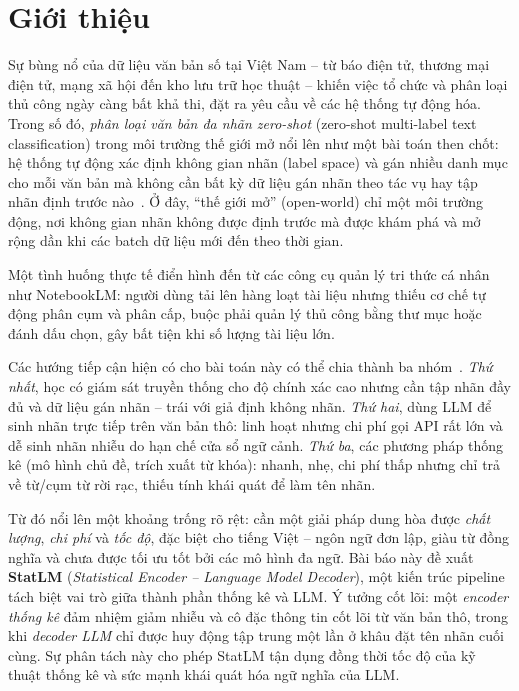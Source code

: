 \section{Giới thiệu}
Sự bùng nổ của dữ liệu văn bản số tại Việt Nam -- từ báo điện
tử, thương mại điện tử, mạng xã hội đến kho lưu trữ học thuật -- khiến việc tổ
chức và phân loại thủ công ngày càng bất khả thi, đặt ra yêu cầu về các hệ thống
tự động hóa. Trong số đó, \emph{phân loại văn bản đa
nhãn zero-shot} (zero-shot multi-label text classification) trong môi trường thế
giới mở nổi lên như một bài toán then chốt: hệ thống tự động xác định không gian
nhãn (label space) và gán nhiều danh mục cho mỗi văn bản mà không cần bất kỳ dữ
liệu gán nhãn theo tác vụ hay tập nhãn định trước nào~\cite{li2024open}. Ở đây,
``thế giới mở'' (open-world) chỉ một môi trường động, nơi không gian nhãn không
được định trước mà được khám phá và mở rộng dần khi các batch dữ liệu mới đến
theo thời gian.

Một tình huống thực tế điển hình đến từ các công cụ quản lý tri thức cá nhân như
NotebookLM: người dùng tải lên hàng loạt tài liệu nhưng thiếu cơ chế tự động
phân cụm và phân cấp, buộc phải quản lý thủ công bằng thư mục hoặc đánh dấu chọn,
gây bất tiện khi số lượng tài liệu lớn.

Các hướng tiếp cận hiện có cho bài toán
này có thể chia thành ba nhóm~\cite{li2024open}. \emph{Thứ nhất}, học có giám sát
truyền thống cho độ chính xác cao nhưng cần tập nhãn đầy đủ và dữ liệu gán nhãn
-- trái với giả định không nhãn. \emph{Thứ hai}, dùng LLM để sinh nhãn trực tiếp
trên văn bản thô: linh hoạt nhưng chi phí gọi API rất lớn và dễ sinh nhãn nhiễu
do hạn chế cửa sổ ngữ cảnh. \emph{Thứ ba}, các phương pháp thống kê (mô hình chủ
đề, trích xuất từ khóa): nhanh, nhẹ, chi phí thấp nhưng chỉ trả về từ/cụm từ rời
rạc, thiếu tính khái quát để làm tên nhãn.

Từ đó nổi lên một khoảng trống rõ rệt: cần một giải pháp dung hòa được
\emph{chất lượng}, \emph{chi phí} và \emph{tốc độ}, đặc biệt cho tiếng Việt --
ngôn ngữ đơn lập, giàu từ đồng nghĩa và chưa được tối ưu tốt bởi các mô hình đa
ngữ. Bài báo này đề xuất \textbf{StatLM} (\emph{Statistical Encoder -- Language
Model Decoder}), một kiến trúc pipeline tách biệt vai trò giữa thành phần thống
kê và LLM. Ý tưởng cốt lõi: một \emph{encoder thống kê} đảm nhiệm giảm nhiễu và
cô đặc thông tin cốt lõi từ văn bản thô, trong khi \emph{decoder LLM} chỉ được
huy động tập trung một lần ở khâu đặt tên nhãn cuối cùng. Sự phân tách này cho
phép StatLM tận dụng đồng thời tốc độ của kỹ thuật thống kê và sức mạnh khái quát
hóa ngữ nghĩa của LLM.

